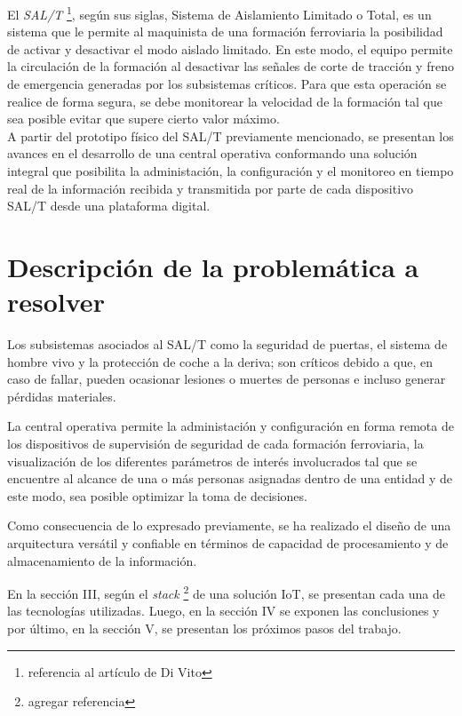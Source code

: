 \documentclass[a4paper]{IEEEtran}
\begin{document}
El \textit{SAL/T} \cite{b1} \footnote{referencia al artículo de Di Vito}, según sus siglas, Sistema de Aislamiento Limitado o Total, es un sistema que le permite al maquinista de una formación ferroviaria la posibilidad de activar y desactivar el modo aislado limitado. En este modo, el equipo permite la circulación de la formación al desactivar las señales de corte de tracción y freno de emergencia generadas por los subsistemas críticos. Para que esta operación se realice de forma segura, se debe monitorear la velocidad de la formación tal que sea posible evitar que supere cierto valor máximo.\\

A partir del prototipo físico del SAL/T previamente mencionado, se presentan los avances en el desarrollo de una central operativa conformando una solución integral que posibilita la administación, la configuración y el monitoreo en tiempo real de la información recibida y transmitida por parte de cada dispositivo SAL/T desde una plataforma digital.


\section{Descripción de la problemática a resolver}

Los subsistemas asociados al SAL/T como la seguridad de puertas, el sistema de hombre vivo y la protección de coche a la deriva; son críticos debido a que, en caso de fallar, pueden ocasionar lesiones o muertes de personas e incluso generar pérdidas materiales. 

La central operativa permite la administación y configuración en forma remota de los dispositivos de supervisión de seguridad de cada formación ferroviaria, la visualización de los diferentes parámetros de interés involucrados tal que se encuentre al alcance de una o más personas asignadas dentro de una entidad y de este modo, sea posible optimizar la toma de decisiones.

Como consecuencia de lo expresado previamente, se ha realizado el diseño de una arquitectura versátil y confiable en términos de capacidad de procesamiento y de almacenamiento de la información.

En la sección III, según el \textit{stack} \cite{b2} \footnote{agregar referencia} de una solución IoT, se presentan cada una de las tecnologías utilizadas. Luego, en la sección IV se exponen las conclusiones y por último, en la sección V, se presentan los próximos pasos del trabajo.
\end{document}
